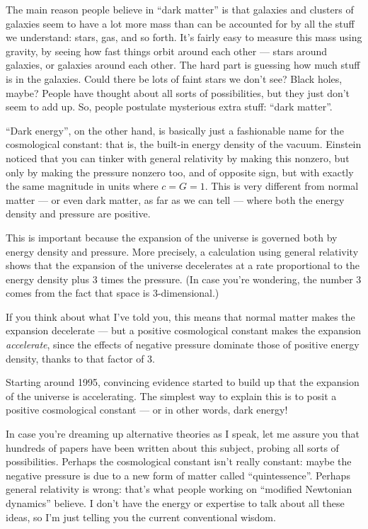 \documentclass{article}
\begin{document}
The main reason people believe in ``dark matter'' is that galaxies and
clusters of galaxies seem to have a lot more mass than can be accounted
for by all the stuff we understand: stars, gas, and so forth. It's
fairly easy to measure this mass using gravity, by seeing how fast
things orbit around each other --- stars around galaxies, or galaxies
around each other. The hard part is guessing how much stuff is in the
galaxies. Could there be lots of faint stars we don't see? Black holes,
maybe? People have thought about all sorts of possibilities, but they
just don't seem to add up. So, people postulate mysterious extra stuff:
``dark matter''.

``Dark energy'', on the other hand, is basically just a fashionable name
for the cosmological constant: that is, the built-in energy density of
the vacuum. Einstein noticed that you can tinker with general relativity
by making this nonzero, but only by making the pressure nonzero too, and
of opposite sign, but with exactly the same magnitude in units where
\(c = G = 1\). This is very different from normal matter --- or even
dark matter, as far as we can tell --- where both the energy density and
pressure are positive.

This is important because the expansion of the universe is governed both
by energy density and pressure. More precisely, a calculation using
general relativity shows that the expansion of the universe decelerates
at a rate proportional to the energy density plus 3 times the pressure.
(In case you're wondering, the number 3 comes from the fact that space
is \(3\)-dimensional.)

If you think about what I've told you, this means that normal matter
makes the expansion decelerate --- but a positive cosmological constant
makes the expansion \emph{accelerate}, since the effects of negative
pressure dominate those of positive energy density, thanks to that
factor of 3.

Starting around 1995, convincing evidence started to build up that the
expansion of the universe is accelerating. The simplest way to explain
this is to posit a positive cosmological constant --- or in other words,
dark energy!

In case you're dreaming up alternative theories as I speak, let me
assure you that hundreds of papers have been written about this subject,
probing all sorts of possibilities. Perhaps the cosmological constant
isn't really constant: maybe the negative pressure is due to a new form
of matter called ``quintessence''. Perhaps general relativity is wrong:
that's what people working on ``modified Newtonian dynamics'' believe. I
don't have the energy or expertise to talk about all these ideas, so I'm
just telling you the current conventional wisdom.
\end{document}
